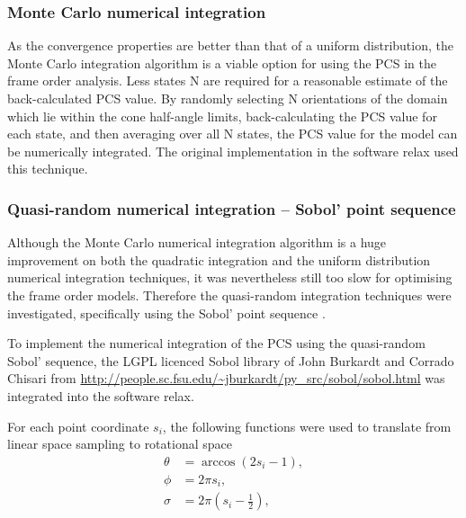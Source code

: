 
\subsubsection{Monte Carlo numerical integration}

As the convergence properties are better than that of a uniform distribution, the Monte Carlo integration algorithm is a viable option for using the PCS in the frame order analysis.
Less states N are required for a reasonable estimate of the back-calculated PCS value.
By randomly selecting N orientations of the domain which lie within the cone half-angle limits, back-calculating the PCS value for each state, and then averaging over all N states, the PCS value for the model can be numerically integrated.
The original implementation in the software relax used this technique.




\subsubsection{Quasi-random numerical integration -- Sobol' point sequence}

Although the Monte Carlo numerical integration algorithm is a huge improvement on both the quadratic integration and the uniform distribution numerical integration techniques, it was nevertheless still too slow for optimising the frame order models.
Therefore the quasi-random integration techniques were investigated, specifically using the Sobol' point sequence \citep{Sobol67}.

To implement the numerical integration of the PCS using the quasi-random Sobol' sequence, the LGPL licenced Sobol library of John Burkardt and Corrado Chisari from \url{http://people.sc.fsu.edu/~jburkardt/py_src/sobol/sobol.html} was integrated into the software relax.

For each point coordinate $s_i$, the following functions were used to translate from linear space sampling to rotational space
\begin{subequations}
\begin{align}
    \theta &= \arccos(2s_i - 1), \\
    \phi   &= 2 \pi s_i, \\
    \sigma &= 2 \pi (s_i - \tfrac{1}{2}),
\end{align}
\end{subequations}

